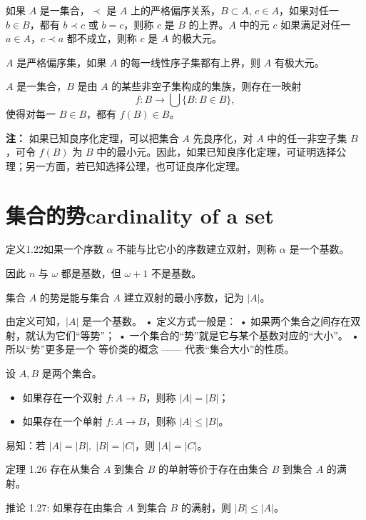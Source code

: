 \begin{definition}[定义 1.19]
如果 $A$ 是一集合，$\prec$ 是 $A$ 上的严格偏序关系，$B \subset A,\, c \in A$，如果对任一 $b \in B$，都有 $b \prec c$ 或 $b = c$，则称 $c$ 是 $B$ 的上界。$A$ 中的元 $c$ 如果满足对任一 $a \in A$，$c \prec a$ 都不成立，则称 $c$ 是 $A$ 的极大元。
\end{definition}

\begin{corollary}[引理 1.20 (Zorn 引理)]
$A$ 是严格偏序集，如果 $A$ 的每一线性序子集都有上界，则 $A$ 有极大元。
\end{corollary}

\begin{axiom}[选择公理 1.21]
$A$ 是一集合，$B$ 是由 $A$ 的某些非空子集构成的集族，则存在一映射
\[
f:B \to \bigcup\{B: B \in B\},
\]
使得对每一 $B \in B$，都有 $f(B) \in B$。
\end{axiom}

\noindent\textbf{注：} 如果已知良序化定理，可以把集合 $A$ 先良序化，对 $A$ 中的任一非空子集 $B$，可令 $f(B)$ 为 $B$ 中的最小元。因此，如果已知良序化定理，可证明选择公理；另一方面，若已知选择公理，也可证良序化定理。
\section{集合的势cardinality of a set}
\begin{definition}
定义1.22如果一个序数 $\alpha$ 不能与比它小的序数建立双射，则称 $\alpha$ 是一个基数。
\end{definition}

因此 $n$ 与 $\omega$ 都是基数，但 $\omega+1$ 不是基数。

\begin{definition}[势]
集合 $A$ 的势是能与集合 $A$ 建立双射的最小序数，记为 $|A|$。
\end{definition}

由定义可知，$|A|$ 是一个基数。	•	定义方式一般是：
	•	如果两个集合之间存在双射，就认为它们“等势”；
	•	一个集合的“势”就是它与某个基数对应的“大小”。
	•	所以“势”更多是一个 等价类的概念 —— 代表“集合大小”的性质。
\begin{definition}[势的比较]
设 $A, B$ 是两个集合。  
\begin{itemize}
  \item 如果存在一个双射 $f: A \to B$，则称 $|A| = |B|$；  
  \item 如果存在一个单射 $f: A \to B$，则称 $|A| \leq |B|$。  
\end{itemize}

易知：若 $|A| = |B|, \; |B| = |C|$，则 $|A| = |C|$。
\end{definition}
\begin{theorem}[有单射就有反项满射]
定理 1.26
存在从集合 $A$ 到集合 $B$ 的单射等价于存在由集合 $B$ 到集合 $A$ 的满射。
\end{theorem}
\begin{corollary}[满射与势的比较]
推论 1.27:
如果存在由集合 $A$ 到集合 $B$ 的满射，则 $|B| \leq |A|$。
\end{corollary}

